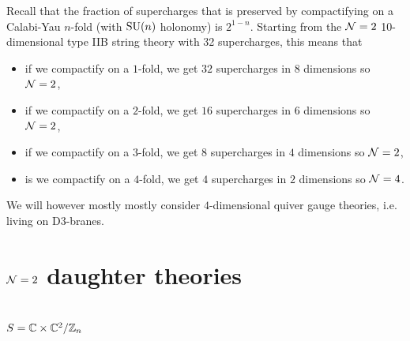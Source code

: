        Recall that the fraction of supercharges that is preserved by compactifying on a Calabi-Yau $n$-fold (with $\text{SU}(n)$ holonomy) is $2^{1-n}$. Starting from the $\mathcal{N}=2$ 10-dimensional type IIB string theory with 32 supercharges, this means that
        \begin{itemize}
            \item if we compactify on a $1$-fold, we get $32$ supercharges in $8$ dimensions so $\mathcal{N}=2$,
            \item if we compactify on a $2$-fold, we get $16$ supercharges in $6$ dimensions so $\mathcal{N}=2$,
            \item if we compactify on a $3$-fold, we get $8$ supercharges in $4$ dimensions so $\mathcal{N}=2$,
            \item is we compactify on a $4$-fold, we get $4$ supercharges in $2$ dimensions so $\mathcal{N}=4$.
        \end{itemize}

        We will however mostly mostly consider $4$-dimensional quiver gauge theories, i.e. living on D$3$-branes.
    

\section{$\mathcal{N}=2$ daughter theories}\label{sec:N2QGT}


    \subsection{$S=\mathbb{C}\times\mathbb{C}^2/\mathbb{Z}_n$}

